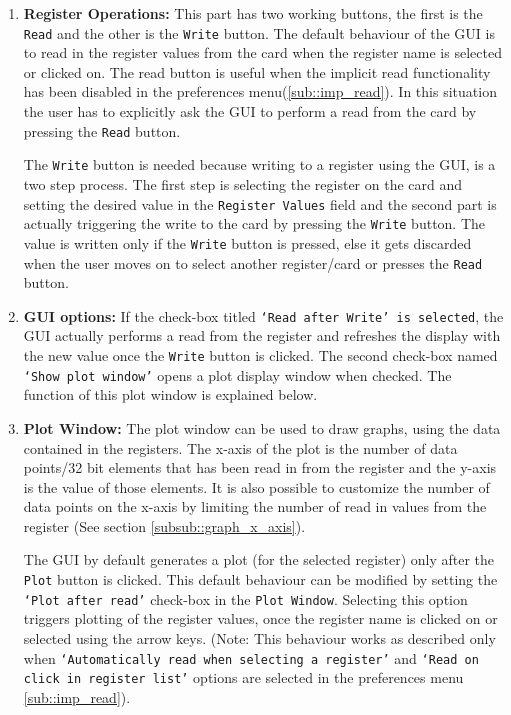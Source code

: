 \begin{enumerate}
\item \textbf{Register Operations:} \label{itm:Register_Operations} This part has two working buttons, the first is the \texttt{Read} and the other is the \texttt{Write} button. The default behaviour of the GUI is to read in the register values from the card when the register name is selected or clicked on. The read button is useful when the implicit read functionality has been disabled in the preferences menu(\ref{sub::imp_read}). In this situation the user has to explicitly ask the GUI to perform a read from the card by pressing the \texttt{Read} button.

The \texttt{Write} button is needed because writing to a register using the GUI, is a two step process. The first step is selecting the register on the card and setting the desired value in the \texttt{Register Values} field and the second part is actually triggering the write to the card by pressing the \texttt{Write} button. The value is written only if the \texttt{Write} button is pressed, else it gets discarded when the user moves on to select another register/card or presses the \texttt{Read} button. 

\item \textbf{GUI options:} If the check-box titled \texttt{`Read after Write' is selected}, the GUI actually performs a read from the register and refreshes the display with the new value once the \texttt{Write} button is clicked. The second check-box named \texttt{`Show plot window'} opens a plot display window when checked. The function of this  plot window is explained below.

\item \textbf{Plot Window:} The plot window can be used to draw graphs, using the data contained in the registers. The x-axis of the plot is the number of data points/32 bit elements that has been read in from the register and the y-axis is the value of those elements. It is also possible to customize the number of data points on the x-axis by limiting the number of read in values from the register (See section \ref{subsub::graph_x_axis}).

The GUI by default generates a plot (for the selected register) only after the \texttt{Plot} button is clicked. This default behaviour can be modified by setting the \texttt{`Plot after read'} check-box in the \texttt{Plot Window}. Selecting this option triggers plotting of the register values, once the register name is clicked on or selected using the arrow keys. (Note: This behaviour works as described only when \texttt{`Automatically read when selecting a register'} and \texttt{`Read on click in register list'} options are selected in the preferences menu \ref{sub::imp_read}).
	

\end{enumerate}
